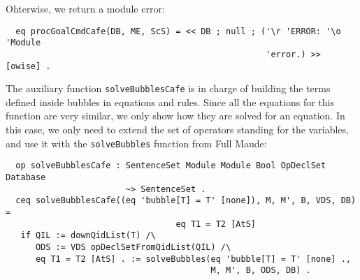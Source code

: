 Ohterwise, we return a module error:

{\codesize
\begin{verbatim}
  eq procGoalCmdCafe(DB, ME, ScS) = << DB ; null ; ('\r 'ERROR: '\o 'Module
                                                    'error.) >> [owise] .
\end{verbatim}
}

The auxiliary function \verb"solveBubblesCafe" is in charge of building the terms
defined inside bubbles in equations and rules. Since all the equations for this function
are very similar, we only show how they are solved for an equation. In this case, we
only need to extend the set of operators standing for the variables, and use it with
the \verb"solveBubbles" function from Full Maude:

{\codesize
\begin{verbatim}
  op solveBubblesCafe : SentenceSet Module Module Bool OpDeclSet Database
                        ~> SentenceSet .
  ceq solveBubblesCafe((eq 'bubble[T] = T' [none]), M, M', B, VDS, DB) =
                                  eq T1 = T2 [AtS]
   if QIL := downQidList(T) /\
      ODS := VDS opDeclSetFromQidList(QIL) /\
      eq T1 = T2 [AtS] . := solveBubbles(eq 'bubble[T] = T' [none] .,
                                         M, M', B, ODS, DB) .
\end{verbatim}
}
